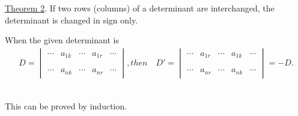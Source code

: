 \documentclass{amsbook}
\begin{document}
\par \underline{Theorem 2}. If two rows (columns) of a determinant are interchanged, the determinant is changed in sign only.\\
\par When the given determinant is\\
\begin{align*}
D=
\begin{vmatrix}
 \cdots & a_{1k} & \cdots & a_{1r} & \cdots \\\\\\
 \cdots & a_{nk} & \cdots & a_{nr} & \cdots 
\end{vmatrix}
,then\quad D'=
\begin{vmatrix}
 \cdots & a_{1r} & \cdots & a_{1k} & \cdots \\\\\\
 \cdots & a_{nr} & \cdots & a_{nk} & \cdots
\end{vmatrix}
 = -D.
\end{align*}\\
\par This can be proved by induction.
\end{document}
